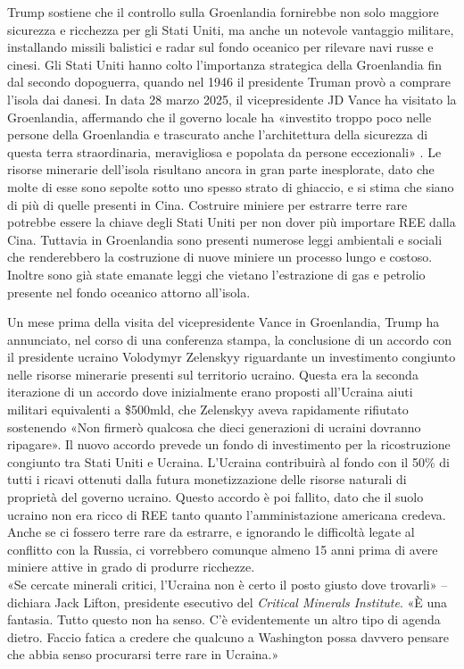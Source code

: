 \documentclass[12pt,a4paper,oneside]{book}
\begin{document}
Trump sostiene che il controllo sulla Groenlandia fornirebbe non solo maggiore sicurezza e ricchezza per gli Stati Uniti, ma anche un notevole vantaggio militare, installando missili balistici e radar sul fondo oceanico per rilevare navi russe e cinesi.
Gli Stati Uniti hanno colto l'importanza strategica della Groenlandia fin dal secondo dopoguerra, quando nel 1946 il presidente Truman provò a comprare l'isola dai danesi. In data 28 marzo 2025, il vicepresidente JD Vance ha visitato la Groenlandia, affermando che il governo locale ha «investito troppo poco nelle persone della Groenlandia e trascurato anche l'architettura della sicurezza di questa terra straordinaria, meravigliosa e popolata da persone eccezionali» \cite{Phi}. 
Le risorse minerarie dell'isola risultano ancora in gran parte inesplorate, dato che molte di esse sono sepolte sotto uno spesso strato di ghiaccio, e si stima che siano di più di quelle presenti in Cina. Costruire miniere per estrarre terre rare potrebbe essere la chiave degli Stati Uniti per non dover più importare REE dalla Cina.
Tuttavia in Groenlandia sono presenti numerose leggi ambientali e sociali che renderebbero la costruzione di nuove miniere un processo lungo e costoso. Inoltre sono già state emanate leggi che vietano l'estrazione di gas e petrolio presente nel fondo oceanico attorno all'isola.

Un mese prima della visita del vicepresidente Vance in Groenlandia, Trump ha annunciato, nel corso di una conferenza stampa, la conclusione di un accordo con il presidente ucraino Volodymyr Zelenskyy riguardante un investimento congiunto nelle risorse minerarie presenti sul territorio ucraino. Questa era la seconda iterazione di un accordo dove inizialmente erano proposti all'Ucraina aiuti militari equivalenti a \$500mld, che Zelenskyy aveva rapidamente rifiutato sostenendo «Non firmerò qualcosa che dieci generazioni di ucraini dovranno ripagare».
Il nuovo accordo prevede un fondo di investimento per la ricostruzione congiunto tra Stati Uniti e Ucraina. L'Ucraina contribuirà al fondo con il 50\% di tutti i ricavi ottenuti dalla futura monetizzazione delle risorse naturali di proprietà del governo ucraino.
Questo accordo è poi fallito, dato che il suolo ucraino non era ricco di REE tanto quanto l'amministazione americana credeva. Anche se ci fossero terre rare da estrarre, e ignorando le difficoltà legate al conflitto con la Russia, ci vorrebbero comunque almeno 15 anni prima di avere miniere attive in grado di produrre ricchezze.\\
«Se cercate minerali critici, l'Ucraina non è certo il posto giusto dove trovarli» – dichiara Jack Lifton, presidente esecutivo del \textit{Critical Minerals Institute}. «È una fantasia. Tutto questo non ha senso. C'è evidentemente un altro tipo di agenda dietro. Faccio fatica a credere che qualcuno a Washington possa davvero pensare che abbia senso procurarsi terre rare in Ucraina.»
\end{document}
